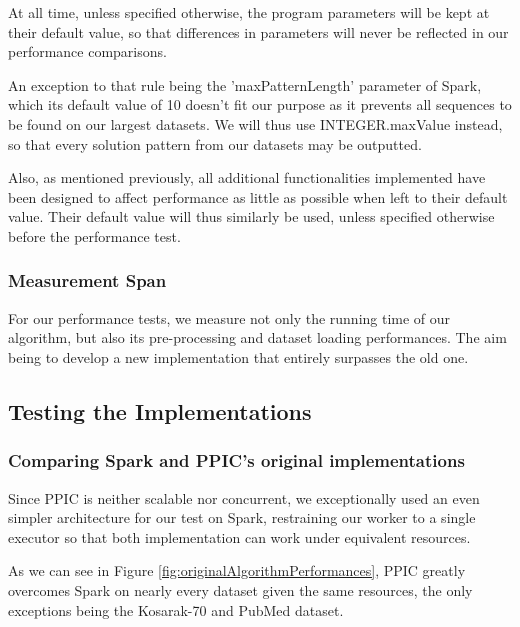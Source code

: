 \documentclass{eplmastersthesis}
\begin{document}
At all time, unless specified otherwise, the program parameters will be kept at their default value, so that differences in parameters will never be reflected in our performance comparisons.\newline

An exception to that rule being the 'maxPatternLength' parameter of Spark, which its default value of 10 doesn't fit our purpose as it prevents all sequences to be found on our largest datasets. We will thus use INTEGER.maxValue instead, so that every solution pattern from our datasets may be outputted.\newline

Also, as mentioned previously, all additional functionalities implemented have been designed to affect performance as little as possible when left to their default value. Their default value will thus similarly be used, unless specified otherwise before the performance test.

\subsubsection{Measurement Span}

For our performance tests, we measure not only the running time of our algorithm, but also its pre-processing and dataset loading performances. The aim being to develop a new implementation that entirely surpasses the old one.

\subsection{Testing the Implementations}

\subsubsection{Comparing Spark and PPIC's original implementations}

Since PPIC is neither scalable nor concurrent, we exceptionally used an even simpler architecture for our test on Spark, restraining our worker to a single executor so that both implementation can work under equivalent resources. \newline

As we can see in Figure \ref{fig:originalAlgorithmPerformances}, PPIC greatly overcomes Spark on nearly every dataset given the same resources, the only exceptions being the Kosarak-70 and PubMed dataset. \newline
\end{document}
